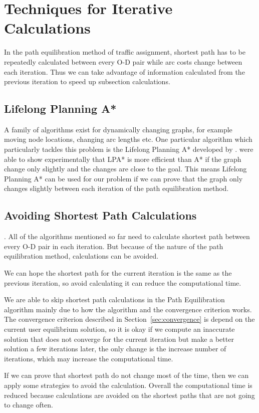 \section{Techniques for Iterative Calculations}
In the path equilibration method of traffic assignment,
shortest path has to be repeatedly calculated between every O-D pair while arc costs change between each iteration.
Thus we can take advantage of information calculated from the previous iteration to speed up subsection calculations.

\subsection{Lifelong Planning A*}
A family of algorithms exist for dynamically changing graphs, for example moving node locations, changing arc lengths etc.
One particular algorithm which particularly tackles this problem is the Lifelong Planning A* developed by \citet{LPA*}.
\citet{LPA*} were able to show experimentally that LPA* is more efficient than A* if the graph change only slightly and the changes are close to the goal.
This means Lifelong Planning A* can be used for our problem if we can prove that the graph only changes slightly  between each iteration of the path equilibration method.

\subsection{Avoiding Shortest Path Calculations} \label{section:avoid}.
All of the algorithms mentioned so far need to calculate shortest path
between every O-D pair in each iteration.
But because of the nature of the path equilibration method,
calculations can be avoided.

We can hope the shortest path for the current iteration is the same as the previous iteration,
so avoid calculating it can reduce the computational time.

We are able to skip shortest path calculations in the Path Equilibration algorithm mainly due to how the algorithm and the convergence criterion works.
The convergence criterion described in Section~\ref{sec:convergence} is depend on the current user equilibrium solution,
so it is okay if we compute an inaccurate solution that does not converge for the current iteration but make a better solution a few iterations later,
the only change is the increase number of iterations,
which may increase the computational time.

If we can prove that shortest path do not change most of the time,
then we can apply some strategies to avoid the calculation.
Overall the computational time is reduced because calculations are avoided on the shortest paths that are not going to change often.

